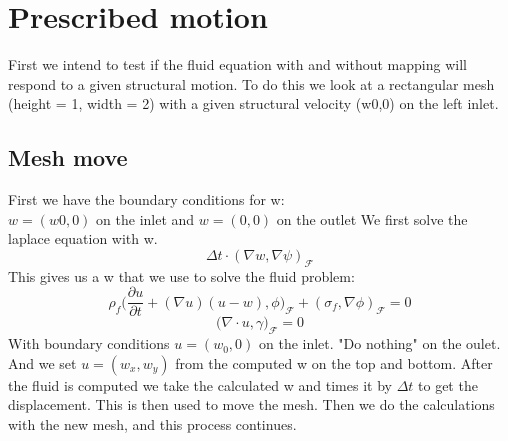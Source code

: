 \section*{Prescribed motion}
First we intend to test if the fluid equation with and without mapping will respond to a given structural motion. To do this we look at a rectangular mesh (height = 1, width = 2) with a given structural velocity (w0,0) on the left inlet.
\subsection*{Mesh move}
First we have the boundary conditions for w: \\
$ w = (w0,0)$ on the inlet and $w = (0,0)$ on the outlet 
We first solve the laplace equation with w.
$$\Delta t\cdot (\nabla w, \nabla \psi)_{\mathcal{F}} $$
This gives us a w that we use to solve the fluid problem:
$$\rho_f \big( \frac{\partial u}{\partial t} + (\nabla u)(u-w) , \phi\big)_{\mathcal{F}} + (\sigma_f ,\nabla \phi )_{\mathcal{F}} = 0  $$
$$\big( \nabla \cdot u ,\gamma \big)_{\mathcal{F}} = 0 $$
With boundary conditions $u = (w_0,0)$ on the inlet. "Do nothing" on the oulet. And we set $u = (w_x, w_y)$ from the computed w on the top and bottom.
After the fluid is computed we take the calculated w and times it by $\Delta t$ to get the displacement. This is then used to move the mesh. Then we do the calculations with the new mesh, and this process continues.
